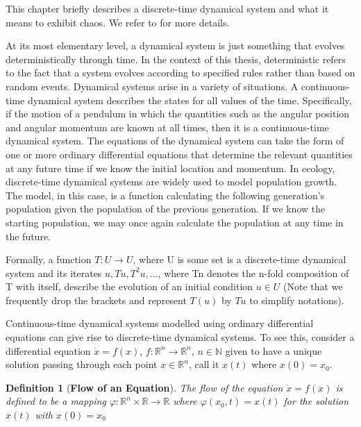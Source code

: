 \documentclass[a4paper,12pt,twoside]{report}
\newtheorem{Definition}{Definition}[]
\begin{document}
This chapter briefly describes a discrete-time dynamical system and what it means to exhibit chaos. We refer to \cite{devaney2018introduction, de2013elements} for more details. 

At its most elementary level, a dynamical system is just something that evolves deterministically through time. In the context of this thesis, deterministic refers to the fact that a system evolves according to specified rules rather than based on random events. 
Dynamical systems arise in a variety of situations. A continuous-time dynamical system describes the states for all values of the time. Specifically, if the motion of a pendulum in which the quantities such as the angular position and angular momentum are known at all times, then it is a continuous-time dynamical system. The equations of the dynamical system can take the form of one or more ordinary differential equations that determine the relevant quantities at any future time if we know the initial location and momentum. 
In ecology, discrete-time dynamical systems are widely used to model population growth. The model, in this case, is a function calculating the following generation's population given the population of the previous generation. If we know the starting population, we may once again calculate the population at any time in the future.

Formally, a function $T : U \to U$, where U is some set is a discrete-time dynamical system and its iterates ${u, Tu, T^{2}{u},\ldots}$, where Tn denotes the n-fold composition of T with itself, describe the evolution of an initial condition $u \in U$ (Note that we frequently drop the brackets and represent $T(u)$ by $Tu$ to simplify notations).





Continuous-time dynamical systems modelled using ordinary differential equations can give rise to discrete-time dynamical systems.  To see this, consider a differential equation $\dot{x} = f(x)$, $f: \mathbb{R}^n \to \mathbb{R}^n$, $n\in\mathbb{N}$ given to have a unique solution passing through 
each point $x\in\mathbb{R}^{n}$, call it $x(t)$ where $x(0)=x_0$. 

\begin{Definition}
  [\bf Flow of an Equation] \label{Dfn_Flow}\rm
  The flow of the equation  $\dot{x} = f(x)$  is defined to be a mapping $\varphi: \mathbb{R}^n \times \mathbb{R} \to \mathbb{R}$ where $\varphi(x_0,t)= x(t)$ for the solution $x(t)$ with $x(0)=x_0$ 
\end{Definition}
\end{document}
